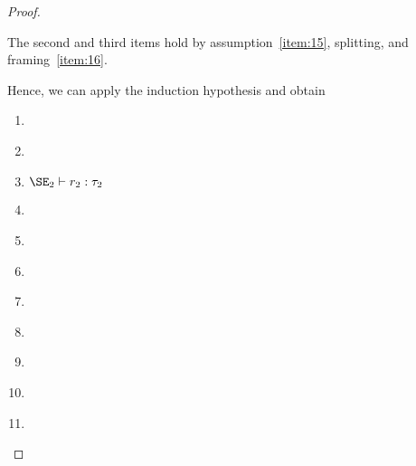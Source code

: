 \begin{proof}
\begin{enumerate}[({A2-}1)]
    The second and third items hold by assumption~\ref{item:15},
    splitting, and framing~\ref{item:16}.
  \end{enumerate}
  Hence, we can apply the induction hypothesis and obtain
  \begin{enumerate}[({R2}-1)]
  \item\label{item:17} 
  \item\label{item:18} 
  \item\label{item:19} $\SE_2 \vdash r_2 : \tau_2$
  \item\label{item:20} 
  \item\label{item:21} 
  \item\label{item:22} 
  \item\label{item:23} 
  \item\label{item:25} 
  \item\label{item:27} 
  \item\label{item:29} 
  \item\label{item:31} 
  \end{enumerate}


\end{proof}
